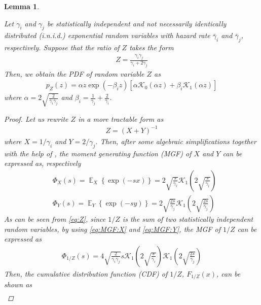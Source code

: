 \documentclass[conference]{IEEEtran}
\newtheorem{lemma}{Lemma}
\DeclareMathOperator{\E}{\mathbb{E}}
\newcommand{\MGF}[2]{\Phi_{#1}\left({#2}\right)}
\newcommand{\EXs}[2]{\E_{{#1}}\left\{{#2}\right\}}
\newcommand{\PDF}[2]{p_{{#1}}\left({#2}\right)}
\newcommand{\CDF}[2]{F_{{#1}}\left({#2}\right)}
\newcommand{\Bessel}[2]{\mathcal{K}_{{#1}}\left({#2}\right)}
\newcommand{\snri}[1]{\gamma_{#1}}
\newcommand{\snravei}[1]{\bar\gamma_{#1}}
\begin{document}
\begin{lemma} \label{lemma:1}

Let $\snri{i}$ and $\snri{j}$ be statistically independent and not
necessarily identically distributed (i.n.i.d.) exponential random
variables with hazard rate $\snravei{i}$ and $\snravei{j}$,
respectively. Suppose that the ratio of $Z$ takes the form
%
%
\begin{align}
    Z=\frac{\snri{i} \snri{j}}{\snri{i} +2\snri{j}}
\end{align}
%
%
Then, we obtain the PDF of random variable $Z$ as
%
%
\begin{align} \label{eq:PDF:Z:1}
    \PDF{Z}{z}
    =
    \alpha z \exp\left(-\beta_i z\right)
    \left[\alpha\Bessel{0}{\alpha z} + \beta_i \Bessel{1}{\alpha z}\right]
\end{align}
%
%
where $\alpha = 2\sqrt{\frac{2}{\snravei{i}\snravei{j}}}$ and
$\beta_i = \frac{1}{\snravei{j}} + \frac{2}{\snravei{i}}$.
\begin{proof}
%
%
Let us rewrite $Z$ in a more tractable form as
%
%
\begin{align} \label{eq:Z}
    Z
    =
    \left(X + Y\right)^{-1}
\end{align}
%
%
where $X=1/\snri{i}$ and $Y=2/\snri{j}$. Then, after some algebraic
simplifications together with the help of
\cite[eq.~(3.471.9)]{GR:00:Book}, the moment generating function
(MGF) of $X$ and $Y$ can be expressed as, respectively
%
%
\begin{align} \label{eq:MGF:X}
    &\MGF{X}{s}
    =
    \EXs{X}{\exp\left(-s x\right)}
    =
    2 \sqrt{\frac{s}{\snravei{i}}} \Bessel{1}{2
    \sqrt{\frac{s}{\snravei{i}}}}
    \\ \label{eq:MGF:Y}
    &\MGF{Y}{s}
    =
    \EXs{Y}{\exp\left(-s y\right)}
    =
    2 \sqrt{\frac{2s}{\snravei{j}}} \Bessel{1}{2
    \sqrt{\frac{2s}{\snravei{j}}}}
\end{align}
%
%
%
%
As can be seen from \eqref{eq:Z}, since $1/Z$ is the sum of two
statistically independent random variables, by using
\eqref{eq:MGF:X} and \eqref{eq:MGF:Y}, the MGF of $1/Z$ can be
expressed as
%
%
\begin{align} \label{eq:MGF:1:Z}
    \MGF{1/Z}{s}
    =
    4\sqrt{\frac{2}{\snravei{i}\snravei{j}}}s \Bessel{1}{2
    \sqrt{\frac{s}{\snravei{i}}}}
    \Bessel{1}{2
    \sqrt{\frac{2s}{\snravei{j}}}}
\end{align}
%
%
Then, the cumulative distribution function (CDF) of $1/Z$,
$\CDF{1/Z}{x}$, can be shown as
%
%
\begin{eqnarray} \label{eq:CDF:1:Z}

\end{eqnarray}
\end{proof}
\end{lemma}
\end{document}
